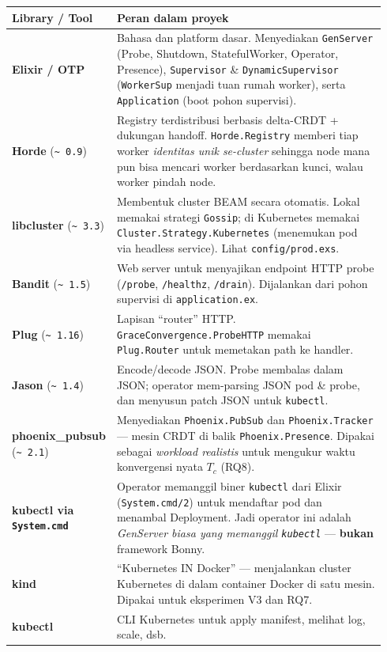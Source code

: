 \documentclass[11pt]{article}
\newcommand{\code}[1]{\texttt{\small #1}}
\begin{document}
\begin{longtable}{@{}p{0.20\linewidth} p{0.74\linewidth}@{}}
\toprule
\textbf{Library / Tool} & \textbf{Peran dalam proyek} \\
\midrule
\endhead
\textbf{Elixir / OTP} & Bahasa dan platform dasar. Menyediakan \code{GenServer} (Probe, Shutdown,
StatefulWorker, Operator, Presence), \code{Supervisor} \& \code{DynamicSupervisor}
(\code{WorkerSup} menjadi tuan rumah worker), serta \code{Application} (boot pohon supervisi). \\
\textbf{Horde} (\code{\~{} 0.9}) & Registry terdistribusi berbasis delta-CRDT + dukungan handoff.
\code{Horde.Registry} memberi tiap worker \emph{identitas unik se-cluster} sehingga node mana pun bisa
mencari worker berdasarkan kunci, walau worker pindah node. \\
\textbf{libcluster} (\code{\~{} 3.3}) & Membentuk cluster BEAM secara otomatis. Lokal memakai strategi
\code{Gossip}; di Kubernetes memakai \code{Cluster.Strategy.Kubernetes} (menemukan pod via headless
service). Lihat \code{config/prod.exs}. \\
\textbf{Bandit} (\code{\~{} 1.5}) & Web server untuk menyajikan endpoint HTTP probe (\code{/probe},
\code{/healthz}, \code{/drain}). Dijalankan dari pohon supervisi di \code{application.ex}. \\
\textbf{Plug} (\code{\~{} 1.16}) & Lapisan ``router'' HTTP. \code{GraceConvergence.ProbeHTTP} memakai
\code{Plug.Router} untuk memetakan path ke handler. \\
\textbf{Jason} (\code{\~{} 1.4}) & Encode/decode JSON. Probe membalas dalam JSON; operator mem-parsing
JSON pod \& probe, dan menyusun patch JSON untuk \code{kubectl}. \\
\textbf{phoenix\_pubsub} (\code{\~{} 2.1}) & Menyediakan \code{Phoenix.PubSub} dan
\code{Phoenix.Tracker} --- mesin CRDT di balik \code{Phoenix.Presence}. Dipakai sebagai
\emph{workload realistis} untuk mengukur waktu konvergensi nyata $T_c$ (RQ8). \\
\textbf{kubectl via \code{System.cmd}} & Operator memanggil biner \code{kubectl} dari Elixir
(\code{System.cmd/2}) untuk mendaftar pod dan menambal Deployment. Jadi operator ini adalah
\emph{GenServer biasa yang memanggil \code{kubectl}} --- \textbf{bukan} framework Bonny. \\
\textbf{kind} & ``Kubernetes IN Docker'' --- menjalankan cluster Kubernetes di dalam container Docker
di satu mesin. Dipakai untuk eksperimen V3 dan RQ7. \\
\textbf{kubectl} & CLI Kubernetes untuk apply manifest, melihat log, scale, dsb. \\

\end{longtable}
\end{document}
